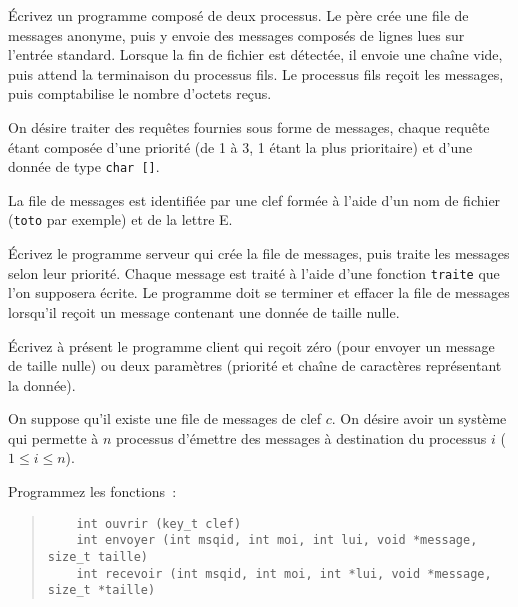 %


% 


\question

Écrivez un programme composé de deux processus. Le père crée
une file de messages anonyme, puis y envoie des messages composés
de lignes lues sur l'entrée standard. Lorsque la fin de fichier
est détectée, il envoie une chaîne vide, puis attend la terminaison
du processus fils. Le processus fils reçoit les messages, puis
comptabilise le nombre d'octets reçus.


\question

On désire traiter des requêtes fournies sous forme de messages, chaque
requête étant composée d'une priorité (de 1 à 3, 1 étant la plus
prioritaire) et d'une donnée de type \verb|char []|.

La file de messages est identifiée par une clef formée à l'aide d'un nom
de fichier ({\tt toto} par exemple) et de la lettre E.

Écrivez le programme serveur qui crée la file de messages, puis traite
les messages selon leur priorité.  Chaque message est traité à l'aide
d'une fonction {\tt traite} que l'on supposera écrite.  Le programme
doit se terminer et effacer la file de messages lorsqu'il reçoit un
message contenant une donnée de taille nulle.

Écrivez à présent le programme client qui reçoit zéro (pour envoyer un
message de taille nulle) ou deux paramètres (priorité et chaîne de
caractères représentant la donnée).


\question

On suppose qu'il existe une file de messages de clef $c$. On désire
avoir un système qui permette à $n$ processus d'émettre des messages à
destination du processus $i$ ($1 \leq i \leq n$).

Programmez les fonctions~:

\begin {quote}
\begin {verbatim}
    int ouvrir (key_t clef)
    int envoyer (int msqid, int moi, int lui, void *message, size_t taille)
    int recevoir (int msqid, int moi, int *lui, void *message, size_t *taille)
\end{verbatim}
\end {quote}

